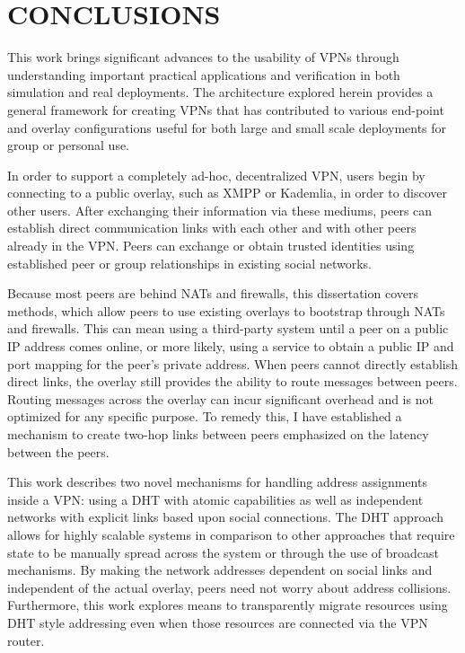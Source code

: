 \chapter{CONCLUSIONS}
\label{chap:conclusion}

This work brings significant advances to the usability of VPNs through
understanding important practical applications and verification in both
simulation and real deployments.  The architecture explored herein provides a
general framework for creating VPNs that has contributed to various end-point
and overlay configurations useful for both large and small scale deployments
for group or personal use.

In order to support a completely ad-hoc, decentralized VPN, users begin by
connecting to a public overlay, such as XMPP or Kademlia, in order to discover
other users.  After exchanging their information via these mediums, peers can
establish direct communication links with each other and with other peers
already in the VPN.  Peers can exchange or obtain trusted identities using
established peer or group relationships in existing social networks.

Because most peers are behind NATs and firewalls, this dissertation covers
methods, which allow peers to use existing overlays to bootstrap through NATs
and firewalls.  This can mean using a third-party system until a peer on a
public IP address comes online, or more likely, using a service to obtain a
public IP and port mapping for the peer's private address.  When peers cannot
directly establish direct links, the overlay still provides the ability to
route messages between peers.  Routing messages across the overlay can incur
significant overhead and is not optimized for any specific purpose.  To remedy
this, I have established a mechanism to create two-hop links between peers
emphasized on the latency between the peers.

This work describes two novel mechanisms for handling address assignments
inside a VPN:  using a DHT with atomic capabilities as well as independent
networks with explicit links based upon social connections.  The DHT approach
allows for highly scalable systems in comparison to other approaches that
require state to be manually spread across the system or through the use of
broadcast mechanisms.  By making the network addresses dependent on social
links and independent of the actual overlay, peers need not worry about address
collisions.  Furthermore, this work explores means to transparently migrate
resources using DHT style addressing even when those resources are connected
via the VPN router.

